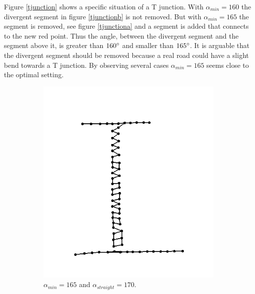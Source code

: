\documentclass[11pt]{article}
\begin{document}
Figure \ref{tjunction} shows a specific situation of a T junction. With $\alpha_{min}=160$ the divergent segment in figure \ref{tjunctionb} is not removed. But with $\alpha_{min}=165$ the segment is removed, see figure \ref{tjunctiona} and a segment is added that connects to the new red point. Thus the angle, between the divergent segment and the segment above it, is greater than $160\degree$ and smaller than $165\degree$. It is arguable that the divergent segment should be removed because a real road could have a slight bend towards a T junction. By observing several cases $\alpha_{min}=165$ seems close to the optimal setting.

\begin{figure}[h]
\centering
  \begin{subfigure}{0.4\linewidth}
  \centering
  \graphicspath{ {images/}}
  \includegraphics[width=\linewidth]{parallel165_165}
  \caption{$\alpha_{min}=165$ and $\alpha_{straight}=170$.}
  \label{parallel}
  \end{subfigure}
    \begin{subfigure}{0.4\linewidth}
  \centering
  \graphicspath{ {images/}}

\end{subfigure}
\end{figure}
\end{document}
